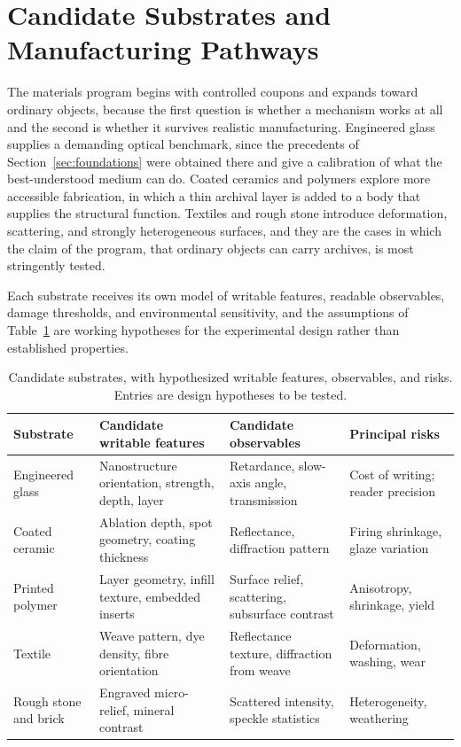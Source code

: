 \section{Candidate Substrates and Manufacturing Pathways}\label{sec:substrates}

The materials program begins with controlled coupons and expands toward ordinary objects, because the first question is whether a mechanism works at all and the second is whether it survives realistic manufacturing. Engineered glass supplies a demanding optical benchmark, since the precedents of Section~\ref{sec:foundations} were obtained there and give a calibration of what the best-understood medium can do. Coated ceramics and polymers explore more accessible fabrication, in which a thin archival layer is added to a body that supplies the structural function. Textiles and rough stone introduce deformation, scattering, and strongly heterogeneous surfaces, and they are the cases in which the claim of the program, that ordinary objects can carry archives, is most stringently tested.

Each substrate receives its own model of writable features, readable observables, damage thresholds, and environmental sensitivity, and the assumptions of Table~\ref{tab:substrates} are working hypotheses for the experimental design rather than established properties.

\begin{table}[h]
\centering
\small
\begin{tabular}{@{}p{2.3cm}p{3.6cm}p{3.5cm}p{3.6cm}@{}}
\toprule
Substrate & Candidate writable features & Candidate observables & Principal risks \\
\midrule
Engineered glass & Nanostructure orientation, strength, depth, layer & Retardance, slow-axis angle, transmission & Cost of writing; reader precision \\
Coated ceramic & Ablation depth, spot geometry, coating thickness & Reflectance, diffraction pattern & Firing shrinkage, glaze variation \\
Printed polymer & Layer geometry, infill texture, embedded inserts & Surface relief, scattering, subsurface contrast & Anisotropy, shrinkage, yield \\
Textile & Weave pattern, dye density, fibre orientation & Reflectance texture, diffraction from weave & Deformation, washing, wear \\
Rough stone and brick & Engraved micro-relief, mineral contrast & Scattered intensity, speckle statistics & Heterogeneity, weathering \\
\bottomrule
\end{tabular}
\caption{Candidate substrates, with hypothesized writable features, observables, and risks. Entries are design hypotheses to be tested.}
\label{tab:substrates}
\end{table}

